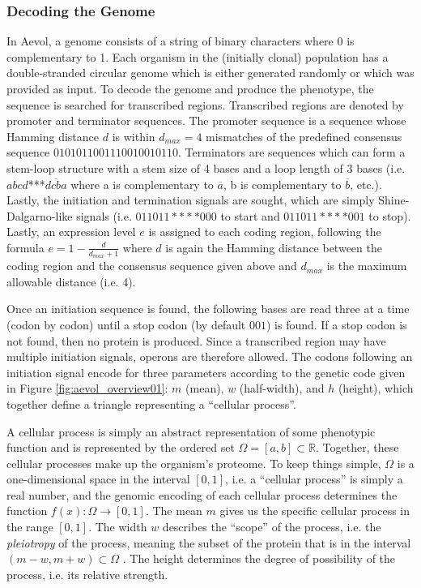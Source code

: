 \subsubsection{Decoding the Genome}\label{subsec:aevol_decoding}
In Aevol, a genome consists of a string of binary characters where 0 is complementary to 1. Each organism in the (initially clonal) population has a double-stranded circular genome which is either generated randomly or which was provided as input. To decode the genome and produce the phenotype, the sequence is searched for transcribed regions. Transcribed regions are denoted by promoter and terminator sequences. The promoter sequence is a sequence whose Hamming distance $d$ is within $d_{max} = 4$ mismatches of the predefined consensus sequence $0101011001110010010110$. Terminators are sequences which can form a stem-loop structure with a stem size of 4 bases and a loop length of 3 bases (i.e. $abcd$***$\overline{dcba}$ where a is complementary to $\overline{a}$, b is complementary to $\overline{b}$, etc.). Lastly, the initiation and termination signals are sought, which are simply Shine-Dalgarno-like signals (i.e. $011011****000$ to start and $011011****001$ to stop). Lastly, an expression level $e$ is assigned to each coding region, following the formula $e = 1 - \frac{d}{d_{max} + 1}$ where $d$ is again the Hamming distance between the coding region and the consensus sequence given above and $d_{max}$ is the maximum allowable distance (i.e. 4). 

Once an initiation sequence is found, the following bases are read three at a time (codon by codon) until a stop codon (by default $001$) is found. If a stop codon is not found, then no protein is produced. Since a transcribed region may have multiple initiation signals, operons are therefore allowed. The codons following an initiation signal encode for three parameters according to the genetic code given in Figure \ref{fig:aevol_overview01}: $m$ (mean), $w$ (half-width), and $h$ (height), which together define a triangle representing a ``cellular process''.

A cellular process is simply an abstract representation of some phenotypic function and is represented by the ordered set $\Omega = \left[ a,b \right] \subset \mathbb{R}$. Together, these cellular processes make up the organism's proteome. To keep things simple, $\Omega$ is a one-dimensional space in the interval $\left[0,1\right]$, i.e. a ``cellular process'' is simply a real number, and the genomic encoding of each cellular process determines the function $f(x) : \Omega \rightarrow \left[0,1\right]$. The mean $m$ gives us the specific cellular process in the range $\left[0,1\right]$. The width $w$ describes the ``scope'' of the process, i.e. the \textit{pleiotropy} of the process, meaning the subset of the protein that is in the interval $ \left(m - w, m + w\right) \subset \Omega$ . The height determines the degree of possibility of the process, i.e. its relative strength.

